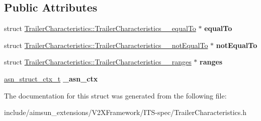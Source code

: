 \subsection*{Public Attributes}
\begin{DoxyCompactItemize}
\item 
struct \hyperlink{structTrailerCharacteristics_1_1TrailerCharacteristics____equalTo}{Trailer\+Characteristics\+::\+Trailer\+Characteristics\+\_\+\+\_\+equal\+To} $\ast$ {\bfseries equal\+To}\hypertarget{structTrailerCharacteristics_a77b6210dff1fe9d5883d9053acb4b5c5}{}\label{structTrailerCharacteristics_a77b6210dff1fe9d5883d9053acb4b5c5}

\item 
struct \hyperlink{structTrailerCharacteristics_1_1TrailerCharacteristics____notEqualTo}{Trailer\+Characteristics\+::\+Trailer\+Characteristics\+\_\+\+\_\+not\+Equal\+To} $\ast$ {\bfseries not\+Equal\+To}\hypertarget{structTrailerCharacteristics_ae8b5fbaf43394619ae0402e724a4b49a}{}\label{structTrailerCharacteristics_ae8b5fbaf43394619ae0402e724a4b49a}

\item 
struct \hyperlink{structTrailerCharacteristics_1_1TrailerCharacteristics____ranges}{Trailer\+Characteristics\+::\+Trailer\+Characteristics\+\_\+\+\_\+ranges} $\ast$ {\bfseries ranges}\hypertarget{structTrailerCharacteristics_af7b2d40bb6c000b940fc4c16b931e9ac}{}\label{structTrailerCharacteristics_af7b2d40bb6c000b940fc4c16b931e9ac}

\item 
\hyperlink{structasn__struct__ctx__s}{asn\+\_\+struct\+\_\+ctx\+\_\+t} {\bfseries \+\_\+asn\+\_\+ctx}\hypertarget{structTrailerCharacteristics_a4afef60a481eb8b7721a6380f9576148}{}\label{structTrailerCharacteristics_a4afef60a481eb8b7721a6380f9576148}

\end{DoxyCompactItemize}


The documentation for this struct was generated from the following file\+:\begin{DoxyCompactItemize}
\item 
include/aimsun\+\_\+extensions/\+V2\+X\+Framework/\+I\+T\+S-\/spec/Trailer\+Characteristics.\+h\end{DoxyCompactItemize}
